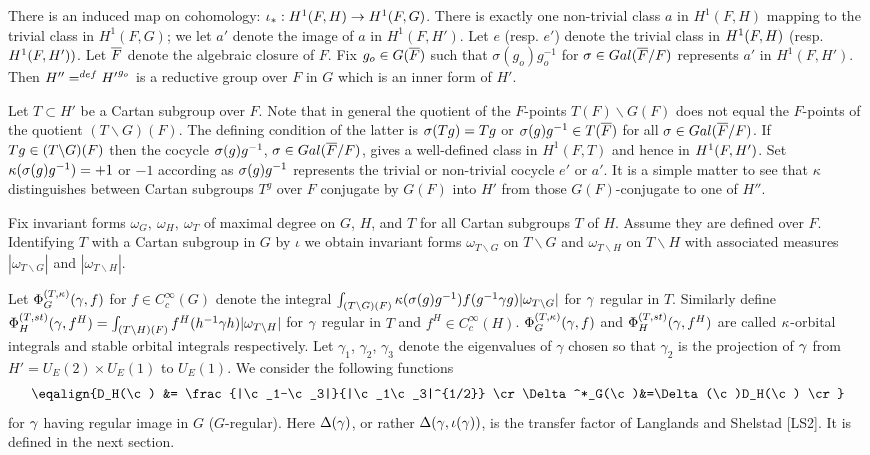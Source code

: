 There is an induced map on cohomology:  $\iota_*: H^1(F,H)  \to
H^1(F,G)$.  There is exactly one non-trivial class
$a$ in $H^1(F,H)$ mapping to the trivial class in $ H^1(F,G)$; we
let $a'$ denote the image of $a$ in $H^1(F,H')$.  Let
$e$ (resp. $e'$) denote the trivial class in $H^1(F,H)$ (resp. $H^1(F,H'))$. 
Let $\overline{F}$ denote the
algebraic closure of $F$.  Fix
$g_o \in G(\overline{F} )$ such that $\sigma(g_o) g_o^{-1}$ for $\sigma \in
{Gal(\overline{F}/F)}$ represents $a'$
in $H^1(F,H')$.  Then $H'' =^{def} {H'}^{g_o}$ is a
reductive group over $F$ in $G$ which is an inner form of $H'$. 

Let $T \subset {H'}$ be a Cartan subgroup over $F$.  Note that in general
the quotient of the $F$-points $T(F)\backslash G(F)$ does not equal the
$F$-points of the quotient $(T\backslash G)(F)$.  The defining condition
of the latter is $\sigma(Tg)=Tg$ or ${\sigma (g)g^{-1}} \in T(\overline{F})$ for all $\sigma\in{Gal(\overline{F}/F)}$.
If $Tg \in {(T\backslash G)(F)}$ then the cocycle ${\sigma (g)g^{-1}}$, $\sigma
\in {Gal(\overline{F}/F)}$, gives a well-defined class in $H^1(F,T) $ and hence in $H^1(F,{H'})$.  Set $\kappa ({\sigma (g)g^{-1}} ) = +1 $ or $-1$  according as ${\sigma (g)g^{-1}}$
represents the trivial or non-trivial cocycle $e'$ or $a'$.  It is
a simple matter to see that 
$\kappa$ distinguishes between Cartan subgroups $T^g$ over $F$
conjugate by $G(F)$ into $H'$ from those $G(F)$-conjugate to one of
$H''$.

Fix invariant forms $\omega_G,\ \omega_H,\ \omega_T$ 
of maximal degree on $G$, $H$, and $T$ for all
Cartan subgroups $T$ of $H$.  Assume they are defined over $F$.  
Identifying $T$ with a Cartan subgroup
in $G$ by $\iota$ we obtain invariant forms $\omega_{T\backslash G}$
on $T\backslash G$ and $\omega_{T\backslash H}$ on $T\backslash H$
with associated measures $|\omega_{T\backslash G}|$ and
$|\omega_{T\backslash H}|$.

\def\KOI#1#2{\Phi^{(T,\kappa)}_G(#1,#2)}
\def\SOI#1#2{\Phi^{(T,st)}_H(#1,#2)}

Let $\KOI \c f$ for $f \in C_c^\infty(G)$ denote the integral $\int_{{(T\backslash G)(F)}}
\kappa({\sigma (g)g^{-1}})f(g{^{-1}}{\gamma} g)|\omega_{T\backslash G}|$ for ${\gamma} $ regular in
$T$.  Similarly define $\SOI \c {f^H} = \int_{(T \backslash H)(F)}
f^H(h\i\c h)|\omega_{T\backslash H}|$ for ${\gamma}$ regular in $T$ and
$f^H \in C_c^\infty(H)$.  $\KOI \c f$ and $\SOI \c {f^H}$ are called
${\kappa}$-orbital integrals and stable orbital integrals respectively.
Let $\gamma_1$, $\gamma_2$, $\gamma_3$ denote the eigenvalues of 
$\gamma$ chosen so that $\gamma_2$ is the projection of ${\gamma}$ 
from $H' = U_E(2)\times U_E(1)$ to $U_E(1)$.  
We consider the following functions
$$\eqalign {D_H(\c) &= \frac{|\c_1-\c_3|}{|\c_1\c_3|^{1/2}} \cr 
\Delta^*_G(\c)&=\Delta(\c)D_H(\c) \cr }$$
for ${\gamma}$ having regular image in $G$ ($G$-regular).
   Here $\Delta({\gamma})$, or rather 
$\Delta({\gamma},\iota({\gamma}))$, is the transfer factor of Langlands 
and Shelstad [LS2].  It is defined in the next section.

